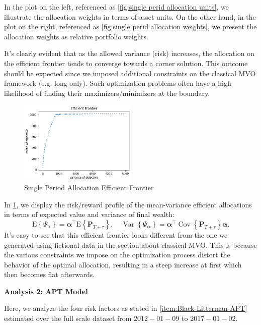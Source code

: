 \documentclass[13pt]{article}
\theoremstyle{definition}
\theoremstyle{remark}
\begin{document}
In the plot on the left, referenced as \cref{fig:single perid allocation units}, we illustrate the allocation weights in terms of asset units. On the other hand, in the plot on the right, referenced as \cref{fig:single perid allocation weights}, we present the allocation weights as relative portfolio weights.

It's clearly evident that as the allowed variance (risk) increases, the allocation on the efficient frontier tends to converge towards a corner solution. This outcome should be expected since we imposed additional constraints on the classical MVO framework (e.g. long-only). Such optimization problems often have a high likelihood of finding their maximizers/minimizers at the boundary.

\begin{figure}[!htp]
    \centering
\includegraphics[width=0.5\textwidth]{single perid allocation efficient frontier.png}
    \caption{Single Period Allocation Efficient Frontier}
    \label{fig:single perid allocation efficient frontier}
\end{figure}
In \cref{fig:single perid allocation efficient frontier}, we display the risk/reward profile of the mean-variance efficient allocations in terms of expected value and variance of final wealth:
$$
\mathrm{E}\left\{\Psi_\alpha\right\}=\boldsymbol{\alpha}^{\top} \mathrm{E}\left\{\mathbf{P}_{T+\tau}\right\}, \quad \operatorname{Var}\left\{\Psi_{\boldsymbol{\alpha}}\right\}=\boldsymbol{\alpha}^{\top} \operatorname{Cov}\left\{\mathbf{P}_{T+\tau}\right\} \boldsymbol{\alpha} .
$$
It's easy to see that this efficient frontier looks different from the one we generated using fictional data in the section about classical MVO. This is because the various constraints we impose on the optimization process distort the behavior of the optimal allocation, resulting in a steep increase at first which then becomes flat afterwards.

{\color{C6}\textbf{Analysis 2: APT Model}}

Here, we analyze the four risk factors as stated in \cref{item:Black-Litterman-APT} estimated over the full scale dataset from $2012-01-09$ to $2017-01-02$.
\end{document}
